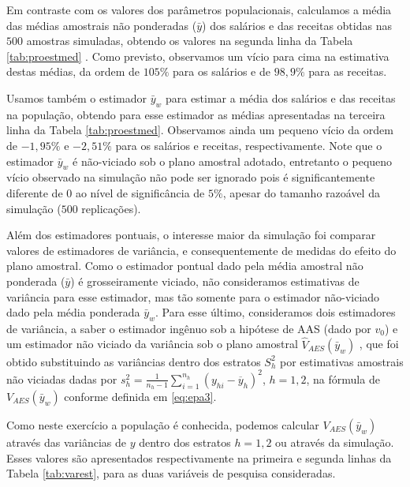 \documentclass[]{book}
\theoremstyle{definition}
\theoremstyle{definition}
\theoremstyle{definition}
\theoremstyle{remark}
\begin{document}
Em contraste com os valores dos parâmetros populacionais, calculamos a
média das médias amostrais não ponderadas (\(\bar{y}\)) dos salários e
das receitas obtidas nas \(500\) amostras simuladas, obtendo os valores
na segunda linha da Tabela \ref{tab:proestmed} . Como previsto,
observamos um vício para cima na estimativa destas médias, da ordem de
\(105\%\) para os salários e de \(98,9\%\) para as receitas.

Usamos também o estimador \(\bar{y}_{w}\) para estimar a média dos
salários e das receitas na população, obtendo para esse estimador as
médias apresentadas na terceira linha da Tabela \ref{tab:proestmed}.
Observamos ainda um pequeno vício da ordem de \(-1,95\%\) e \(-2,51\%\)
para os salários e receitas, respectivamente. Note que o estimador
\(\bar{y}_{w}\) é não-viciado sob o plano amostral adotado, entretanto o
pequeno vício observado na simulação não pode ser ignorado pois é
significantemente diferente de \(0\) ao nível de significância de
\(5\%\), apesar do tamanho razoável da simulação (\(500\) replicações).

Além dos estimadores pontuais, o interesse maior da simulação foi
comparar valores de estimadores de variância, e consequentemente de
medidas do efeito do plano amostral. Como o estimador pontual dado pela
média amostral não ponderada (\(\bar{y}\)) é grosseiramente viciado, não
consideramos estimativas de variância para esse estimador, mas tão
somente para o estimador não-viciado dado pela média ponderada
\(\bar{y}_{w}\). Para esse último, consideramos dois estimadores de
variância, a saber o estimador ingênuo sob a hipótese de AAS (dado por
\(v_{0}\)) e um estimador não viciado da variância sob o plano amostral
\(\hat{V}_{AES}\left( \bar{y}_{w}\right)\) , que foi obtido substituindo
as variâncias dentro dos estratos \(S_{h}^{2}\) por estimativas
amostrais não viciadas dadas por
\(s_{h}^{2}=\frac{1}{n_{h}-1}\sum_{i=1}^{n_{h}}(y_{hi}-\overline{y}_{h})^{2}\),
\(h=1,2\), na fórmula de \(V_{AES}\left( \bar{y}_{w}\right)\) conforme
definida em \eqref{eq:epa3}.

Como neste exercício a população é conhecida, podemos calcular
\(V_{AES}\left(\bar{y}_{w}\right)\) através das variâncias de \(y\)
dentro dos estratos \(h=1,2\) ou através da simulação. Esses valores são
apresentados respectivamente na primeira e segunda linhas da Tabela
\ref{tab:varest}, para as duas variáveis de pesquisa consideradas.
\end{document}
